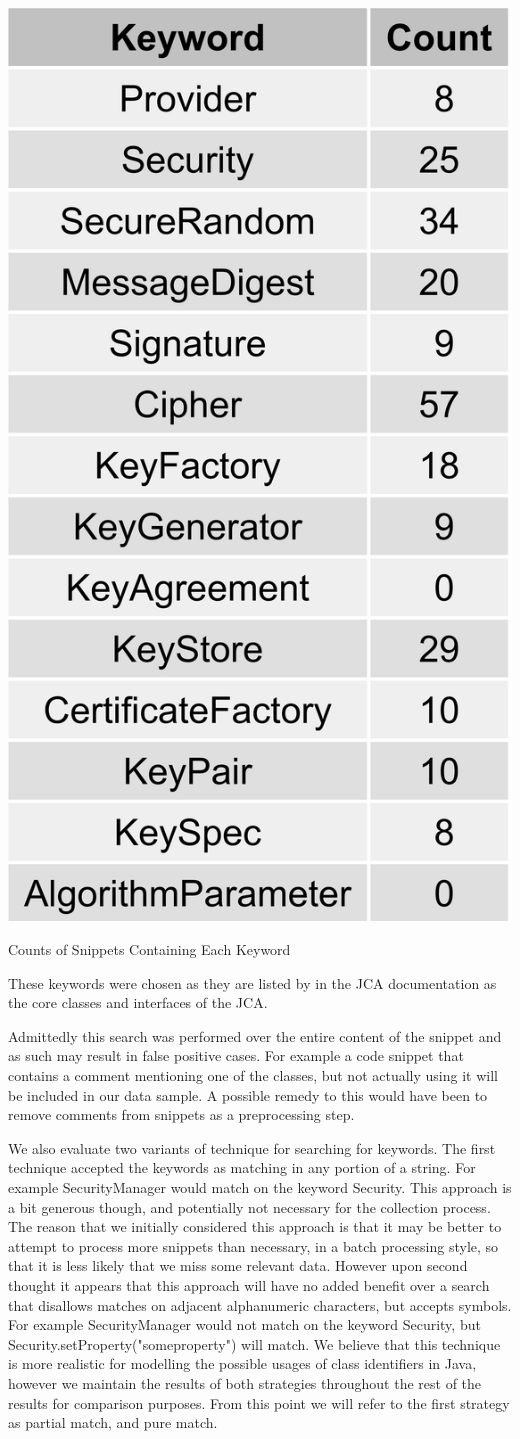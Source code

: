 \documentclass[10pt, conference]{IEEEtran}
\begin{document}
\begin{table}[h]
\begin{center}
\includegraphics[width=0.5\linewidth]{KeywordCounts.png}
\caption{Counts of Snippets Containing Each Keyword}
\end{center}
\end{table}

These keywords were chosen as they are listed by in the JCA documentation \cite{JCA} as the core classes and interfaces of the JCA.

Admittedly this search was performed over the entire content of the snippet and as such may result in false positive cases. For example a code snippet that contains a comment mentioning one of the classes, but not actually using it will be included in our data sample. A possible remedy to this would have been to remove comments from snippets as a preprocessing step. 


We also evaluate two variants of technique for searching for keywords. The first technique accepted the keywords as matching in any portion of a string. For example SecurityManager would match on the keyword Security. This approach is a bit generous though, and potentially not necessary for the collection process. The reason that we initially considered this approach is that it may be better to attempt to process more snippets than necessary, in a batch processing style, so that it is less likely that we miss some relevant data. However upon second thought it appears that this approach will have no added benefit over a search that disallows matches on adjacent alphanumeric characters, but accepts symbols. For example SecurityManager would not match on the keyword Security, but Security.setProperty("someproperty") will match. We believe that this technique is more realistic for modelling the possible usages of class identifiers in Java, however we maintain the results of both strategies throughout the rest of the results for comparison purposes. 
From this point we will refer to the first strategy as partial match, and pure match.
\end{document}

